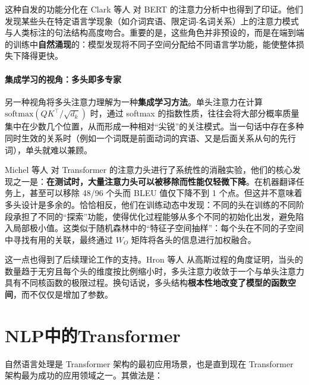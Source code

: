 这种自发的功能分化在 Clark 等人\cite{clark2019doesbertlookat} 对 BERT 的注意力分析中也得到了印证。他们发现某些头在特定语言学现象（如介词宾语、限定词-名词关系）上的注意力模式与人类标注的句法结构高度吻合。重要的是，这些角色并非预设的，而是在端到端的训练中\textbf{自然涌现}的：模型发现将不同子空间分配给不同语言学功能，能使整体损失下降得更快。

\paragraph{集成学习的视角：多头即多专家}

另一种视角将多头注意力理解为一种\textbf{集成学习方法}。单头注意力在计算 $\text{softmax}(QK^\top/\sqrt{d_k})$ 时，通过 softmax 的指数性质，往往会将大部分概率质量集中在少数几个位置，从而形成一种相对“尖锐”的关注模式。当一句话中存在多种同时生效的关系时（例如一个词既是前面动词的宾语、又是后面关系从句的先行词），单头就难以兼顾。

Michel 等人\cite{michel2019sixteenheadsreallybetter} 对 Transformer 的注意力头进行了系统性的消融实验，他们的核心发现之一是：\textbf{在测试时，大量注意力头可以被移除而性能仅轻微下降}。在机器翻译任务上，甚至可以移除 48/96 个头而 BLEU 值仅下降不到 1 个点。但这并不意味着多头设计是多余的。恰恰相反，他们在训练动态中发现：不同的头在训练的不同阶段承担了不同的“探索”功能，使得优化过程能够从多个不同的初始化出发，避免陷入局部极小值。这类似于随机森林中的“特征子空间抽样”：每个头在不同的子空间中寻找有用的关联，最终通过 $W_O$ 矩阵将各头的信息进行加权融合。

这一点也得到了后续理论工作的支持。Hron 等人\cite{hron2020infiniteattentionnngpntk} 从高斯过程的角度证明，当头的数量趋于无穷且每个头的维度按比例缩小时，多头注意力收敛于一个与单头注意力具有不同核函数的极限过程。换句话说，多头结构\textbf{根本性地改变了模型的函数空间}，而不仅仅是增加了参数。

\section{NLP中的Transformer}
自然语言处理是 Transformer 架构的最初应用场景，也是直到现在 Transformer 架构最为成功的应用领域之一。其做法是：

